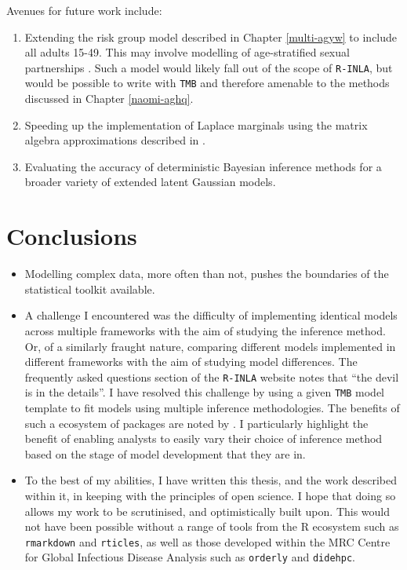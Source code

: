 \documentclass[a4paper, nobind]{templates/ociamthesis}
\providecommand{\tightlist}{%
  \setlength{\itemsep}{0pt}\setlength{\parskip}{0pt}}
\begin{document}
Avenues for future work include:

\begin{enumerate}
\def\labelenumi{\arabic{enumi}.}
\tightlist
\item
  Extending the risk group model described in Chapter \ref{multi-agyw} to include all adults 15-49. This may involve modelling of age-stratified sexual partnerships \autocite{wolock2021evaluating}.
  Such a model would likely fall out of the scope of \texttt{R-INLA}, but would be possible to write with \texttt{TMB} and therefore amenable to the methods discussed in Chapter \ref{naomi-aghq}.
\item
  Speeding up the implementation of Laplace marginals using the matrix algebra approximations described in \textcite{wood2020simplified}.
\item
  Evaluating the accuracy of deterministic Bayesian inference methods for a broader variety of extended latent Gaussian models.
\end{enumerate}

\hypertarget{conclusions-1}{%
\section{Conclusions}\label{conclusions-1}}

\begin{itemize}
\tightlist
\item
  Modelling complex data, more often than not, pushes the boundaries of the statistical toolkit available.
\item
  A challenge I encountered was the difficulty of implementing identical models across multiple frameworks with the aim of studying the inference method. Or, of a similarly fraught nature, comparing different models implemented in different frameworks with the aim of studying model differences. The frequently asked questions section of the \texttt{R-INLA} website \autocite{rinla2023faq} notes that ``the devil is in the details''. I have resolved this challenge by using a given \texttt{TMB} model template to fit models using multiple inference methodologies. The benefits of such a ecosystem of packages are noted by \textcite{stringer2021fields}. I particularly highlight the benefit of enabling analysts to easily vary their choice of inference method based on the stage of model development that they are in.
\item
  To the best of my abilities, I have written this thesis, and the work described within it, in keeping with the principles of open science. I hope that doing so allows my work to be scrutinised, and optimistically built upon. This would not have been possible without a range of tools from the R ecosystem such as \texttt{rmarkdown} and \texttt{rticles}, as well as those developed within the MRC Centre for Global Infectious Disease Analysis such as \texttt{orderly} and \texttt{didehpc}.
\end{itemize}
\end{document}
